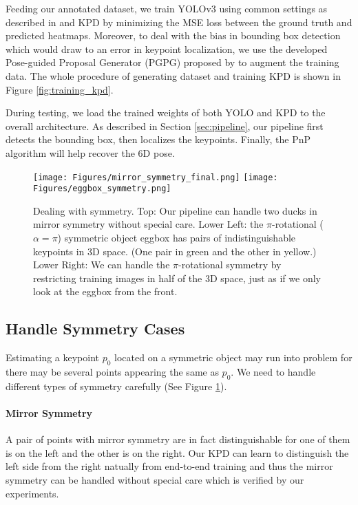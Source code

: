 \documentclass[10pt,twocolumn,letterpaper]{article}
\begin{document}
Feeding our annotated dataset, we train YOLOv3 using common settings as described in \cite{DBLP:journals/corr/abs-1804-02767} and KPD by minimizing the MSE loss between the ground truth and predicted heatmaps. Moreover, to deal with the bias in bounding box detection which would draw to an error in keypoint localization, we use the developed Pose-guided Proposal Generator (PGPG) proposed by \cite{fang2017rmpe} to augment the training data. The whole procedure of generating dataset and training KPD is shown in Figure \ref{fig:training_kpd}.

During testing, we load the trained weights of both YOLO and KPD to the overall architecture. As described in Section \ref{sec:pipeline}, our pipeline first detects the bounding box, then localizes the keypoints. Finally, the PnP algorithm will help recover the 6D pose.

\begin{figure}[t]
\begin{center}
   \texttt{[image: Figures/mirror\_symmetry\_final.png]}
   \texttt{[image: Figures/eggbox\_symmetry.png]}
\end{center}
   \caption{Dealing with symmetry. Top: Our pipeline can handle two ducks in mirror symmetry without special care. Lower Left: the $\pi$-rotational ($\alpha = \pi$) symmetric object eggbox has pairs of indistinguishable keypoints in 3D space. (One pair in green and the other in yellow.) Lower Right: We can handle the $\pi$-rotational symmetry by restricting training images in half of the 3D space, just as if we only look at the eggbox from the front.}
\label{fig:symmetry_explain}
\end{figure}
\subsection{Handle Symmetry Cases}

Estimating a keypoint $p_0$ located on a symmetric object may run into problem for there may be several points appearing the same as $p_0$. We need to handle different types of symmetry carefully (See Figure \ref{fig:symmetry_explain}).

\paragraph{Mirror Symmetry} A pair of points with mirror symmetry are in fact distinguishable for one of them is on the left and the other is on the right. Our KPD can learn to distinguish the left side from the right natually from end-to-end training and thus the mirror symmetry can be handled without special care which is verified by our experiments.
\end{document}
